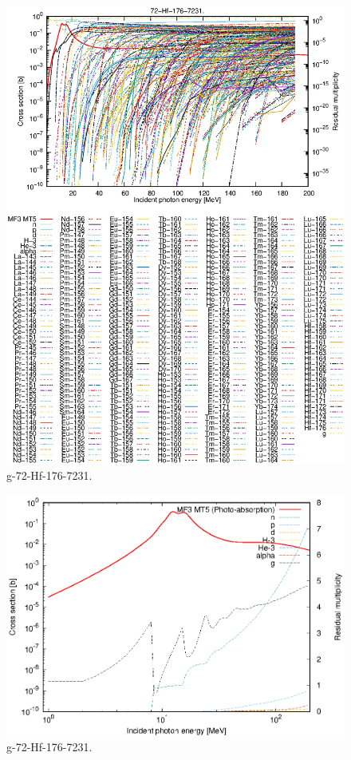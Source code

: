 \begin{figure}
 \includegraphics[width=\linewidth]{eps/g_72-Hf-176_7231.eps}
  \caption{g-72-Hf-176-7231.}
\end{figure}
\newpage \clearpage

\begin{figure}
 \includegraphics[width=\linewidth]{eps-log/g_72-Hf-176_7231.eps}
 \caption{g-72-Hf-176-7231.}
\end{figure}
\newpage \clearpage

